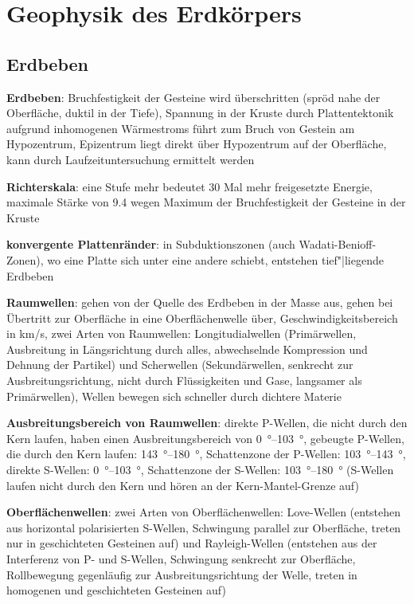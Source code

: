 \chapter{%
    Geophysik des Erdkörpers%
}

\section{%
    Erdbeben%
}

\textbf{Erdbeben}:
Bruchfestigkeit der Gesteine wird überschritten (spröd nahe der Oberfläche, duktil in der Tiefe),
Spannung in der Kruste durch Plattentektonik aufgrund inhomogenen Wärmestroms
führt zum Bruch von Gestein am Hypozentrum,
Epizentrum liegt direkt über Hypozentrum auf der Oberfläche,
kann durch Laufzeituntersuchung ermittelt werden

\textbf{Richterskala}:
eine Stufe mehr bedeutet 30 Mal mehr freigesetzte Energie,
maximale Stärke von \num{9.4} wegen Maximum der Bruchfestigkeit der Gesteine in der Kruste

\textbf{konvergente Plattenränder}:
in Subduktionszonen (auch Wadati-Benioff-Zonen), wo eine Platte sich unter eine andere schiebt,
entstehen tief"|liegende Erdbeben

\textbf{Raumwellen}:
gehen von der Quelle des Erdbeben in der Masse aus,
gehen bei Übertritt zur Oberfläche in eine Oberflächenwelle über,
Geschwindigkeitsbereich in \si{\kilo\meter/\second},
zwei Arten von Raumwellen:
Longitudialwellen (Primärwellen, Ausbreitung in Längsrichtung durch alles,
abwechselnde Kompression und Dehnung der Partikel) und
Scherwellen (Sekundärwellen, senkrecht zur Ausbreitungsrichtung,
nicht durch Flüssigkeiten und Gase, langsamer als Primärwellen),
Wellen bewegen sich schneller durch dichtere Materie

\textbf{Ausbreitungsbereich von Raumwellen}:
direkte P-Wellen, die nicht durch den Kern laufen, haben einen Ausbreitungsbereich von
\SIrange{0}{103}{\degree},
gebeugte P-Wellen, die durch den Kern laufen: \SIrange{143}{180}{\degree},
Schattenzone der P-Wellen: \SIrange{103}{143}{\degree},
direkte S-Wellen: \SIrange{0}{103}{\degree},
Schattenzone der S-Wellen: \SIrange{103}{180}{\degree}
(S-Wellen laufen nicht durch den Kern und hören an der Kern-Mantel-Grenze auf)

\textbf{Oberflächenwellen}:
zwei Arten von Oberflächenwellen:
Love-Wellen (entstehen aus horizontal polarisierten S-Wellen,
Schwingung parallel zur Oberfläche, treten nur in geschichteten Gesteinen auf) und
Rayleigh-Wellen (entstehen aus der Interferenz von P- und S-Wellen,
Schwingung senkrecht zur Oberfläche,
Rollbewegung gegenläufig zur Ausbreitungsrichtung der Welle,
treten in homogenen und geschichteten Gesteinen auf)


